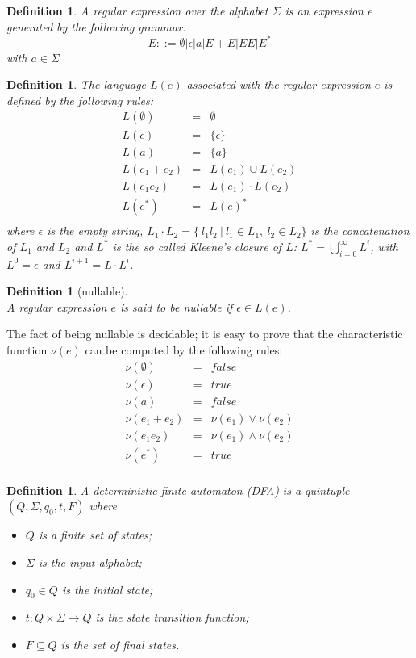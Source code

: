 \documentclass[preprint]{sigplanconf}
\newcommand{\true}{\mathit{true}}
\newcommand{\false}{\mathit{false}}
\newcommand{\Le}[1]{L(#1)}
\newcommand{\nul}[1]{\ensuremath{\nu(#1)}}
\newcounter{item}
\newtheorem{definition}[item]{Definition}
\begin{document}
\begin{definition}
A regular expression over the alphabet $\Sigma$ is 
an expression $e$ generated by the following grammar:
\[E ::= \emptyset | \epsilon | a | E+E | EE | E^* \]
with $a \in \Sigma$
\end{definition}

\begin{definition}
The language $\Le{e}$ associated with the regular expression $e$ 
is defined by the following rules:
\[
\begin{array}{rcl}
\Le \emptyset &=& \emptyset\\
\Le \epsilon &=& \{\epsilon\}\\
\Le a &=& \{ a \}\\
\Le{e_1 + e_2} &=& \Le{e_1} \cup \Le{e_2}\\
\Le{e_1e_2} &=& \Le{e_1} \cdot \Le{e_2} \\ 
\Le{e^*} &=& \Le{e}^* \\ 
\end{array}
\]
where $\epsilon$ is the empty string, 
$L_1 \cdot L_2 = \{~ l_1l_2 ~|~ l_1 \in L_1,~ l_2 \in L_2 \}$ is the
concatenation of $L_1$ and $L_2$
and $L^*$ is the so called Kleene's closure of $L$: $L^* = \bigcup_{i=0}^\infty L^i$, with $L^0 = {\epsilon}$ and $L^{i+1} = L \cdot L^i$.
\end{definition}

\begin{definition}[nullable]~\\
A regular expression $e$ is said to be nullable if $\epsilon \in \Le{e}$.
\end{definition}

\noindent
The fact of being  nullable is decidable; it is easy to prove that the 
characteristic function $\nul{e}$ can be computed by the following 
rules:
\[
\begin{array}{rcl}
\nul{\emptyset} &=& \false \\
\nul{\epsilon} &=& \true \\
\nul{a} &=& \false \\
\nul{e_1+e_2} &=& \nul{e_1} \vee \nul{e_2}\\
\nul{e_1e_2} &=& \nul{e_1} \wedge \nul{e_2}\\
\nul{e^*} &=& \true\\
\end{array}
\]

\begin{definition}
A deterministic finite automaton (DFA) is a quintuple $(Q,\Sigma,q_0,t,F)$ 
where
\begin{itemize}
\item $Q$ is a finite set of states;
\item $\Sigma$ is the input alphabet;
\item $q_0 \in Q$ is the initial state;
\item $t: Q \times \Sigma \to Q$ is the state transition function;
\item $F \subseteq Q$ is the set of final states.
\end{itemize}
\end{definition}
\end{document}
